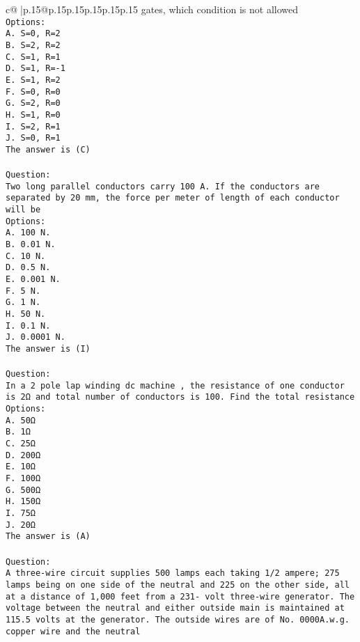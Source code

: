 \documentclass{article}
\begin{document}
{\begin{supertabular}{c@{$\;$}|p{.15\linewidth}@{}p{.15\linewidth}p{.15\linewidth}p{.15\linewidth}p{.15\linewidth}p{.15\linewidth}}
{{{gates, which condition is not allowed\\ \tt Options:\\ \tt A. S=0, R=2\\ \tt B. S=2, R=2\\ \tt C. S=1, R=1\\ \tt D. S=1, R=-1\\ \tt E. S=1, R=2\\ \tt F. S=0, R=0\\ \tt G. S=2, R=0\\ \tt H. S=1, R=0\\ \tt I. S=2, R=1\\ \tt J. S=0, R=1\\ \tt The answer is (C)\\ \tt \\ \tt Question:\\ \tt Two long parallel conductors carry 100 A. If the conductors are separated by 20 mm, the force per meter of length of each conductor will be\\ \tt Options:\\ \tt A. 100 N.\\ \tt B. 0.01 N.\\ \tt C. 10 N.\\ \tt D. 0.5 N.\\ \tt E. 0.001 N.\\ \tt F. 5 N.\\ \tt G. 1 N.\\ \tt H. 50 N.\\ \tt I. 0.1 N.\\ \tt J. 0.0001 N.\\ \tt The answer is (I)\\ \tt \\ \tt Question:\\ \tt In a 2 pole lap winding dc machine , the resistance of one conductor is 2Ω and total number of conductors is 100. Find the total resistance\\ \tt Options:\\ \tt A. 50Ω\\ \tt B. 1Ω\\ \tt C. 25Ω\\ \tt D. 200Ω\\ \tt E. 10Ω\\ \tt F. 100Ω\\ \tt G. 500Ω\\ \tt H. 150Ω\\ \tt I. 75Ω\\ \tt J. 20Ω\\ \tt The answer is (A)\\ \tt \\ \tt Question:\\ \tt A three-wire circuit supplies 500 lamps each taking 1/2 ampere; 275 lamps being on one side of the neutral and 225 on the other side, all at a distance of 1,000 feet from a 231- volt three-wire generator. The voltage between the neutral and either outside main is maintained at 115.5 volts at the generator. The outside wires are of No. 0000A.w.g. copper wire and the neutral }}}
\end{supertabular}}
\end{document}
